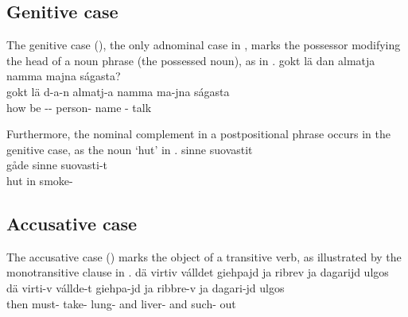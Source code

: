 \subsection{Genitive case}\label{genitive}
The genitive case (\GENs), the only adnominal case in \PS, %
marks the possessor modifying the head of a noun phrase (the possessed noun), as in . 
\ea\label{gen1}
\glll	gokt lä {dan} {almatja} namma majna ságasta?\\ %
	gokt lä d-a-n almatj-a namma ma-jna ságasta\\
	how be\BS{} -- person- name\BS{} - talk\BS{}\\\nopagebreak
{} 
\z

Furthermore, the nominal complement in a postpositional phrase occurs in the genitive case, as the noun  ‘hut’ in .
\ea\label{gen2}
 sinne suovastit\\ %
	gåde sinne suovasti-t\\
	hut\BS{} in smoke-\\\nopagebreak
{} 
\z


\subsection{Accusative case}\label{accusative}
The accusative case (\ACCs) marks the object of a transitive verb, as illustrated by the monotransitive clause in .  
\ea\label{acc1}
\glll	dä virtiv válldet {giehpajd} ja {ribrev} ja {dagarijd} ulgos\\ %
	dä virti-v vállde-t giehpa-jd ja ribbre-v ja dagari-jd ulgos\\
	then must- take- lung- and liver- and such- out\\\nopagebreak
{} 
\z


